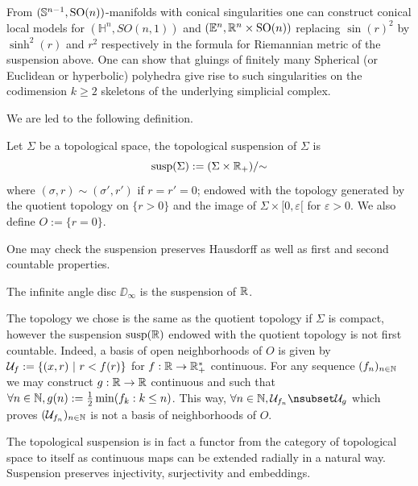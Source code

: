 From $(\mathbb{S}^{n-1},\mathrm{SO}(n))$-manifolds with conical singularities one can construct conical local models for $(\mathbb H^n,SO(n,1))$ and $(\mathbb E^n, \mathbb R^n\times \mathrm{SO}(n))$ replacing $\sin(r)^2$ by $\sinh^2(r)$ and $r^2$ respectively in the 
formula for Riemannian metric of the suspension above. 
One can show that gluings of finitely many Spherical (or Euclidean or hyperbolic) polyhedra give rise to such singularities on the codimension $k\geq 2$ skeletons of the underlying simplicial complex. 

We are led to the following definition.
\begin{defi}
 Let $\Sigma$ be a  topological space, the topological suspension of $\Sigma$ is
 $$ \mathrm{susp}(\Sigma):= (\Sigma \times \mathbb R_+)/{\sim}$$
where $(\sigma,r) \sim (\sigma',r')$ if $r=r'=0$; endowed with the topology generated by the  quotient topology on $\{r>0\}$ and the image of $\Sigma\times [0,\varepsilon[$ for $\varepsilon>0$.
We also define $O:= \{r=0\}$.
 \end{defi}
 \begin{rem} One may check the suspension preserves Hausdorff as well as first and second countable properties. 
 \end{rem}
 \begin{rem} The infinite angle disc $\DD_\infty$ is the suspension of $\mathbb R$.
  
 \end{rem}

\begin{cex} The topology we chose is the same as the quotient topology if $\Sigma$ is compact, however the suspension
 $\mathrm{susp}(\mathbb R)$ endowed with the quotient topology  is not first countable. Indeed, a basis of open neighborhoods of $O$ is given by $\mathcal{U}_f := \{(x,r)~|~ r<f(r)\}$ for $f:\mathbb R\rightarrow \mathbb R_+^*$ continuous. 
 For any sequence $(f_n)_{n\in \mathbb{N}}$ we may construct $g:\mathbb R\rightarrow \mathbb R$ continuous and such that
 $\forall n\in \mathbb{N}, g(n):= \frac{1}{2}\min(f_k : k\leq n )$. 
 This way,  $\forall n\in \N, \U_{f_n} \nsubset \U_g$ which proves $(\mathcal{U}_{f_n})_{n\in \mathbb{N}}$ is not a basis of neighborhoods of $O$.
\end{cex}

\begin{rem}
 The topological suspension is in fact a functor from the category of topological space to itself as continuous maps can be extended radially in a natural way. Suspension preserves injectivity, surjectivity and embeddings.
\end{rem}

